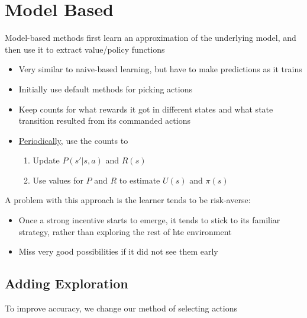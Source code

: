\chapter{Model Based}\label{chapter-model-based}

  Model-based methods first learn an approximation of the underlying
  model, and then use it to extract value/policy functions

  \begin{itemize}
    \item Very similar to naive-based learning, but have to make predictions
    as it trains
    \item Initially use default methods for picking actions
    \item Keep counts for what rewards it got in different states and what
    state transition resulted from its commanded actions
    \item \ul{Periodically}, use the counts to
    \begin{enumerate}
      \item Update $ P\left( s' | s, a \right) $ and $ R\left( s \right) $
      \item Use values for $ P $ and $ R $ to estimate $ U\left( s \right) $
      and $ \pi\left( s \right) $
    \end{enumerate}
  \end{itemize}

  A problem with this approach is the learner tends to be risk-averse:

  \begin{itemize}
    \item Once a strong incentive starts to emerge, it tends to stick to its
    familiar strategy, rather than exploring the rest of hte environment
    \item Miss very good possibilities if it did not see them early
  \end{itemize}

\section{Adding Exploration}

  To improve accuracy, we change our method of selecting actions

